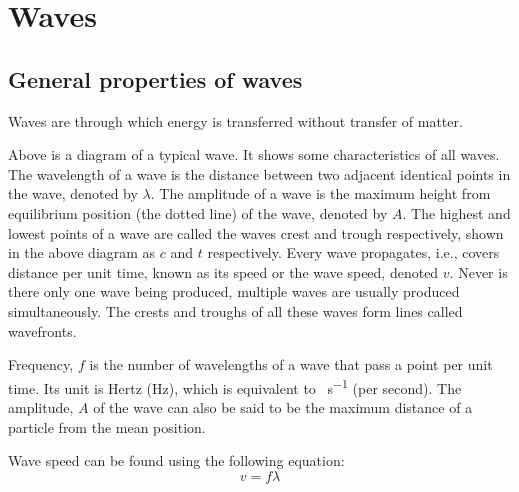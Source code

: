 \section{Waves}
\subsection{General properties of waves}

Waves are through which energy is transferred without transfer of matter.

\begin{center}
\end{center}
Above is a diagram of a typical wave. It shows some characteristics of all waves. The wavelength
of a wave is the distance between two adjacent identical points in the wave, denoted by $\lambda$. The
amplitude of a wave is the maximum height from equilibrium position (the dotted line) of the wave,
denoted by $A$. The highest and lowest points of a wave are called the waves crest and trough
respectively, shown in the above diagram as $c$ and $t$ respectively. Every wave propagates, i.e.,
covers distance per unit time, known as its speed or the wave speed, denoted $v$. Never is there
only one wave being produced, multiple waves are usually produced simultaneously. The crests
and troughs of all these waves form lines called wavefronts.

Frequency, $f$ is the number of wavelengths of a wave that pass a point per unit time. Its unit
is Hertz (Hz), which is equivalent to \SI{}{s^{-1}} (per second). The amplitude, $A$ of the
wave can also be said to be the maximum distance of a particle from the mean position.

Wave speed can be found using the following equation:
$$ v = f\lambda$$

